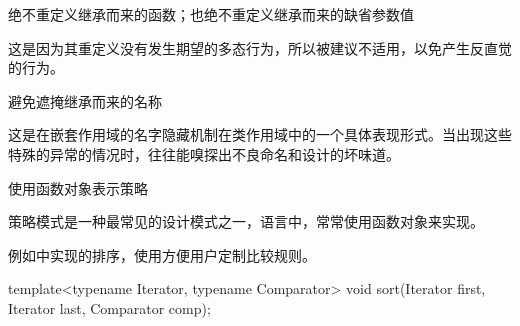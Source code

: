 \begin{content}
\begin{regulation}
绝不重定义继承而来的函数；也绝不重定义继承而来的缺省参数值
\end{regulation}

这是因为其重定义没有发生期望的多态行为，所以被建议不适用，以免产生反直觉的行为。

\begin{regulation}
避免遮掩继承而来的名称
\end{regulation}

这是在嵌套作用域的名字隐藏机制在类作用域中的一个具体表现形式。当出现这些特殊的异常的情况时，往往能嗅探出不良命名和设计的坏味道。

\begin{regulation}
使用函数对象表示策略
\end{regulation}

策略模式是一种最常见的设计模式之一，语言中，常常使用函数对象来实现。

例如中实现的排序，使用方便用户定制比较规则。

\begin{leftbar}
\begin{c++}
template<typename Iterator, typename Comparator>
void sort(Iterator first, Iterator last, Comparator comp);
\end{c++}
\end{leftbar}

\end{content}
